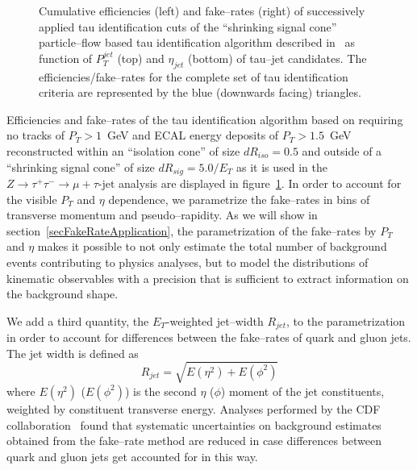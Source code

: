 \begin{figure}[t]
\begin{center}
\begin{picture}
\end{picture}
\caption[$P_T$ and $\eta$ dependency of tau ID performance]{Cumulative
efficiencies (left) and fake--rates (right) of successively applied tau
identification cuts of the ``shrinking signal cone'' particle--flow based tau
identification algorithm described in~\cite{PFlowTauReco} as function of
$P_{T}^{jet}$ (top) and $\eta_{jet}$ (bottom) of tau--jet candidates.  The
efficiencies/fake--rates for the complete set of tau identification criteria are
represented by the blue (downwards facing) triangles.}
\label{figPFTauReco_EfficienciesAndFakeRates}
\end{center}
\end{figure} 

Efficiencies and fake--rates of the tau identification algorithm based on
requiring no tracks of $P_{T} > 1$~GeV and ECAL energy deposits of $P_{T} >
1.5$~GeV reconstructed within an ``isolation cone'' of size $dR_{iso} = 0.5$ and
outside of a ``shrinking signal cone'' of size $dR_{sig} = 5.0 / E_{T}$ as it is
used in the $Z \rightarrow \tau^{+} \tau^{-} \rightarrow \mu + \tau\mbox{-jet}$
analysis are displayed in figure~\ref{figPFTauReco_EfficienciesAndFakeRates}.
In order to account for the visible $P_{T}$ and $\eta$ dependence, we
parametrize the fake--rates in bins of transverse momentum and pseudo--rapidity.
As we will show in section~\ref{secFakeRateApplication}, the parametrization of
the fake--rates by $P_{T}$ and $\eta$ makes it possible to not only estimate the
total number of background events contributing to physics analyses, but to model
the distributions of kinematic observables with a precision that is sufficient
to extract information on the background shape.

We add a third quantity, the $E_{T}$-weighted jet--width $R_{jet}$, to the
parametrization in order to account for differences between the fake--rates of
quark and gluon jets.  The jet width is defined as 
\begin{equation}
R_{jet} = \sqrt{E \left( \eta^2 \right) + E \left( \phi^2 \right)}
\end{equation}
where $E \left( \eta^2 \right)$ ($E \left( \phi^2 \right)$) is the second $\eta$
($\phi$) moment of the jet constituents, weighted by constituent transverse
energy. Analyses performed by the CDF collaboration~\cite{CDFtypeFakeRateMethod}
found that systematic uncertainties on background estimates obtained from the
fake--rate method are reduced in case differences between quark and gluon jets
get accounted for in this way.

